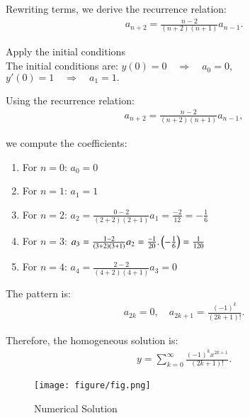 \documentclass[journal]{IEEEtran}
\begin{document}
Rewriting terms, we derive the recurrence relation:
\begin{align}
a_{n+2} = \frac{n-2}{(n+2)(n+1)}a_{n-1}.
\end{align}

Apply the initial conditions\\

The initial conditions are:
$y(0) = 0 \quad \Rightarrow \quad a_0 = 0,$\\
$y'(0) = 1 \quad \Rightarrow \quad a_1 = 1.$

Using the recurrence relation:
\begin{align}
a_{n+2} = \frac{n-2}{(n+2)(n+1)}a_{n-1},
\end{align}

we compute the coefficients:

\begin{enumerate}
    \item For $n = 0$: $a_0 = 0$
    \item For $n = 1$: $a_1 = 1$
    \item For $n = 2$: $a_2 = \frac{0 - 2}{(2+2)(2+1)}a_1 = \frac{-2}{12} = -\frac{1}{6}$
    \item For $n = 3$: $a_3 = \frac{1 - 2}{(3+2)(3+1)}a_2 = \frac{-1}{20}.\left(-\frac{1}{6}\right) = \frac{1}{120}$
    \item For $n = 4$: $a_4 = \frac{2 - 2}{(4+2)(4+1)}a_3 = 0$
\end{enumerate}

The pattern is:
\begin{align}
a_{2k} = 0, \quad a_{2k+1} = \frac{(-1)^k}{(2k+1)!}.
\end{align}

Therefore, the homogeneous solution is:
\begin{align}
y= \sum_{k=0}^\infty \frac{(-1)^k x^{2k+1}}{(2k+1)!}.
\end{align}
\begin{figure}[h!]
   \centering
   \texttt{[image: figure/fig.png]} 
   \caption{Numerical Solution}
   \label{stemplot}
\end{figure}
\end{document}
